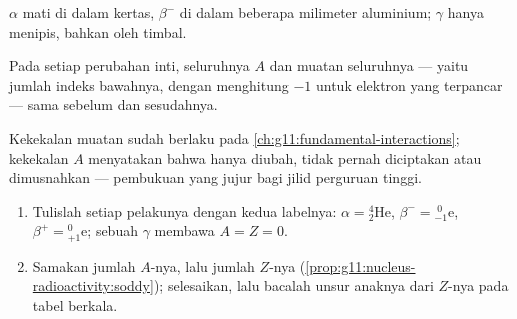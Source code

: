 \begin{omfigure}

{\small $\alpha$ mati di dalam kertas, $\beta^-$ di dalam beberapa milimeter
aluminium; $\gamma$ hanya menipis, bahkan oleh timbal.}
\end{omfigure}

\begin{proposition}\label{prop:g11:nucleus-radioactivity:soddy}
Pada setiap perubahan inti,  seluruhnya $A$ dan muatan
seluruhnya --- yaitu jumlah indeks bawahnya, dengan menghitung $-1$ untuk
elektron yang terpancar --- sama sebelum dan sesudahnya.
\end{proposition}
\admitted

\begin{remark}
Kekekalan muatan sudah berlaku pada
\cref{ch:g11:fundamental-interactions}; kekekalan $A$ menyatakan bahwa
 hanya diubah, tidak pernah diciptakan atau dimusnahkan ---
pembukuan yang jujur bagi jilid perguruan tinggi.
\end{remark}

\begin{method}\label{met:g11:nucleus-radioactivity:balance}
\begin{enumerate}
  \item Tulislah setiap pelakunya dengan kedua labelnya:
        $\alpha = {}^{4}_{2}\mathrm{He}$,
        $\beta^- = {}^{\;0}_{-1}\mathrm{e}$,
        $\beta^+ = {}^{0}_{+1}\mathrm{e}$; sebuah $\gamma$ membawa
        $A = Z = 0$.
  \item Samakan jumlah $A$-nya, lalu jumlah $Z$-nya
        (\cref{prop:g11:nucleus-radioactivity:soddy}); selesaikan, lalu
        bacalah unsur anaknya dari $Z$-nya pada tabel berkala.
\end{enumerate}
\end{method}

